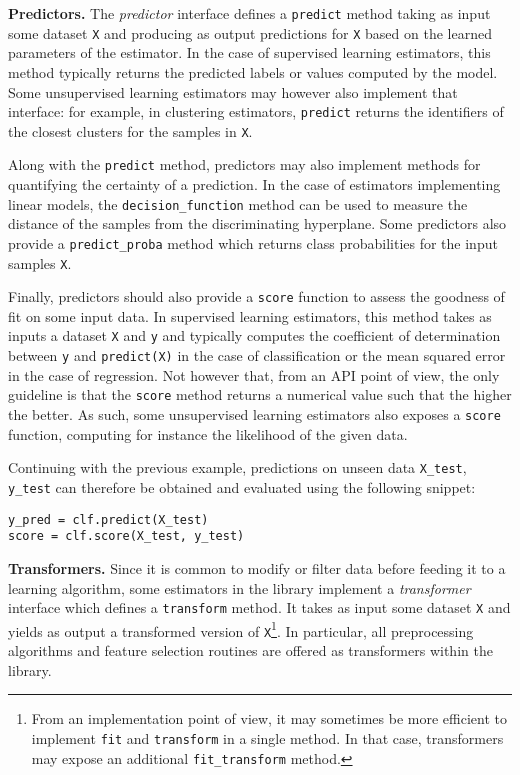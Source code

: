 \documentclass{llncs}
\begin{document}
\textbf{Predictors.} The \textit{predictor} interface defines a \texttt{predict}
method taking as input some dataset \texttt{X} and producing as output
predictions for \texttt{X} based on the learned parameters of the estimator. In
the case of supervised learning estimators, this method typically returns the
predicted labels or values computed by the model. Some unsupervised learning
estimators may however also implement that interface: for example, in clustering
estimators, \texttt{predict} returns the identifiers of the closest clusters for
the samples in \texttt{X}.

Along with the \texttt{predict} method, predictors may also implement methods
for quantifying the certainty of a prediction. In the case of estimators
implementing linear models, the \texttt{decision\_function} method can be used
to measure the distance of the samples from the discriminating hyperplane. Some
predictors also provide a \texttt{predict\_proba} method which returns
class probabilities for the input samples \texttt{X}.

Finally, predictors should also provide a \texttt{score} function to assess the
goodness of fit on some input data. In supervised learning estimators, this
method takes as inputs a dataset \texttt{X} and \texttt{y} and typically
computes the coefficient of determination between \texttt{y} and
\texttt{predict(X)} in the case of classification or the mean squared error in
the case of regression. Not however that, from an API point of view, the only
guideline is that the \texttt{score} method returns a numerical value such that
the higher the better. As such, some unsupervised learning estimators also
exposes a \texttt{score} function, computing for instance the likelihood of the
given data.

Continuing with the previous example, predictions on unseen data
\texttt{X\_test}, \texttt{y\_test} can therefore be obtained and evaluated using
the following snippet:
\begin{verbatim}
y_pred = clf.predict(X_test)
score = clf.score(X_test, y_test)
\end{verbatim}

\textbf{Transformers.} Since it is common to modify or filter data before
feeding it to a learning algorithm, some estimators in the library implement a
\textit{transformer} interface which defines a \texttt{transform} method. It
takes as input some dataset \texttt{X} and yields as output a transformed
version of \texttt{X}\footnote{From an implementation point of view, it may
sometimes be more efficient to implement \texttt{fit} and \texttt{transform} in
a single method. In that case, transformers may expose an additional
\texttt{fit\_transform} method.}. In particular, all preprocessing algorithms
and feature selection routines are offered as transformers within the library.
\end{document}
